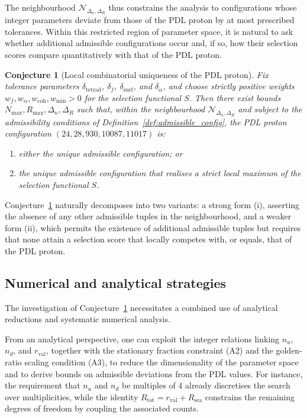 \documentclass[11pt,a4paper]{article}
\newtheorem{conjecture}{Conjecture}
\theoremstyle{definition}
\begin{document}
The neighbourhood $\mathcal{N}_{\Delta_n,\Delta_R}$ thus constrains the analysis to configurations whose integer parameters deviate from those of the PDL proton by at most prescribed tolerances.\cite{Combinatorial_Proton_v2_2026} Within this restricted region of parameter space, it is natural to ask whether additional admissible configurations occur and, if so, how their selection scores compare quantitatively with that of the PDL proton.

\begin{conjecture}[Local combinatorial uniqueness of the PDL proton]
\label{conj:local_uniqueness}
Fix tolerance parameters $\delta_{\mathrm{tetrad}}$, $\delta_f$, $\delta_{\mathrm{surf}}$, and $\delta_{\alpha}$, and choose strictly positive weights $w_f,w_{\alpha},w_{\mathrm{coh}},w_{\mathrm{min}}>0$ for the selection functional $S$. Then there exist bounds $N_{\max},R_{\max},\Delta_n,\Delta_R$ such that, within the neighbourhood $\mathcal{N}_{\Delta_n,\Delta_R}$ and subject to the admissibility conditions of Definition~\ref{def:admissible_config}, the PDL proton configuration $(24,28,930,10087,11017)$ is:
\begin{enumerate}
  \item[(i)] either the unique admissible configuration; or
  \item[(ii)] the unique admissible configuration that realises a strict local maximum of the selection functional $S$.
\end{enumerate}
\end{conjecture}

Conjecture~\ref{conj:local_uniqueness} naturally decomposes into two variants: a strong form (i), asserting the absence of any other admissible tuples in the neighbourhood, and a weaker form (ii), which permits the existence of additional admissible tuples but requires that none attain a selection score that locally competes with, or equals, that of the PDL proton.\cite{Combinatorial_Proton_v2_2026,PDL_Global_Mapping_2026}

\subsection{Numerical and analytical strategies}

The investigation of Conjecture~\ref{conj:local_uniqueness} necessitates a combined use of analytical reductions and systematic numerical analysis.

From an analytical perspective, one can exploit the integer relations linking $n_u$, $n_d$, and $r_{\mathrm{val}}$, together with the stationary fraction constraint (A2) and the golden-ratio scaling condition (A3), to reduce the dimensionality of the parameter space and to derive bounds on admissible deviations from the PDL values.\cite{Combinatorial_Proton_v2_2026} For instance, the requirement that $n_u$ and $n_d$ be multiples of $4$ already discretises the search over multiplicities, while the identity $R_{\mathrm{tot}} = r_{\mathrm{val}} + R_{\mathrm{sea}}$ constrains the remaining degrees of freedom by coupling the associated counts.
\end{document}
